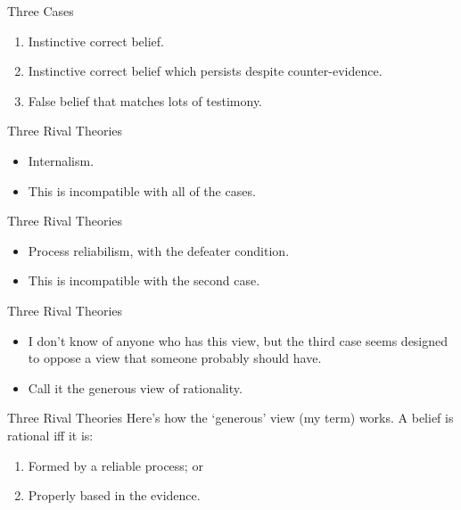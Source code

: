 \documentclass[
  17pt,
  letterpaper,
  ignorenonframetext,
  aspectratio=169,
]{beamer}
\providecommand{\tightlist}{%
  \setlength{\itemsep}{0pt}\setlength{\parskip}{0pt}}\usepackage{longtable,booktabs,array}
\begin{document}
\begin{frame}{Three Cases}
\protect\hypertarget{three-cases}{}
\begin{enumerate}[<+->]
\tightlist
\item
  Instinctive correct belief.
\item
  Instinctive correct belief which persists despite counter-evidence.
\item
  False belief that matches lots of testimony.
\end{enumerate}
\end{frame}

\begin{frame}{Three Rival Theories}
\protect\hypertarget{three-rival-theories}{}
\begin{itemize}[<+->]
\tightlist
\item
  Internalism.
\item
  This is incompatible with all of the cases.
\end{itemize}
\end{frame}

\begin{frame}{Three Rival Theories}
\protect\hypertarget{three-rival-theories-1}{}
\begin{itemize}[<+->]
\tightlist
\item
  Process reliabilism, with the defeater condition.
\item
  This is incompatible with the second case.
\end{itemize}
\end{frame}

\begin{frame}{Three Rival Theories}
\protect\hypertarget{three-rival-theories-2}{}
\begin{itemize}[<+->]
\tightlist
\item
  I don't know of anyone who has this view, but the third case seems
  designed to oppose a view that someone probably should have.
\item
  Call it the generous view of rationality.
\end{itemize}
\end{frame}

\begin{frame}{Three Rival Theories}
\protect\hypertarget{three-rival-theories-3}{}
Here's how the `generous' view (my term) works. A belief is rational iff
it is:

\begin{enumerate}[<+->]
\tightlist
\item
  Formed by a reliable process; or
\item
  Properly based in the evidence.
\end{enumerate}
\end{frame}
\end{document}
